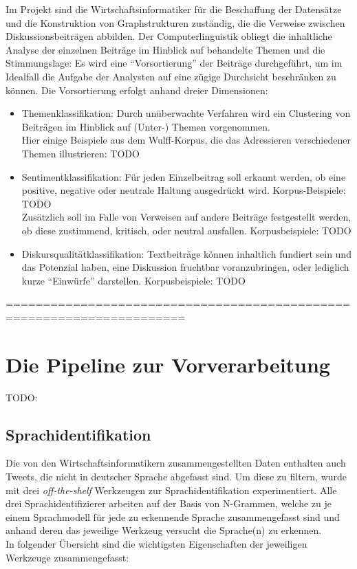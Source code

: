\documentclass[11pt]{article}
\begin{document}
Im Projekt sind die Wirtschaftsinformatiker für die Beschaffung der
Datensätze und die Konstruktion von Graphstrukturen zuständig, die die
Verweise zwischen Diskussionsbeiträgen abbilden. Der
Computerlinguistik obliegt die inhaltliche Analyse der einzelnen
Beiträge im Hinblick auf behandelte Themen und die Stimmungslage: Es
wird eine ``Vorsortierung'' der Beiträge durchgeführt, um im Idealfall
die Aufgabe der Analysten auf eine zügige Durchsicht beschränken zu
können. Die Vorsortierung erfolgt anhand dreier Dimensionen:
\begin{itemize}
\item Themenklassifikation: Durch unüberwachte Verfahren wird ein
  Clustering von Beiträgen im Hinblick auf (Unter-) Themen
  vorgenommen.\\ Hier einige Beispiele aus dem Wulff-Korpus, die das
  Adressieren verschiedener Themen illustrieren: TODO
\item Sentimentklassifikation: Für jeden Einzelbeitrag soll erkannt
  werden, ob eine positive, negative oder neutrale Haltung ausgedrückt
  wird. Korpus-Beispiele: TODO\\ Zusätzlich soll im Falle von Verweisen auf andere Beiträge
  festgestellt werden, ob diese zustimmend, kritisch, oder neutral
  ausfallen. Korpusbeispiele: TODO
\item Diskursqualitätklassifikation: Textbeiträge können inhaltlich
  fundiert sein und das Potenzial haben, eine Diskussion fruchtbar
  voranzubringen, oder lediglich kurze ``Einwürfe''
  darstellen. Korpusbeispiele: TODO
\end{itemize}


======================================================================
\section{Die Pipeline zur Vorverarbeitung}

TODO:
\subsection{Sprachidentifikation}

Die von den Wirtschaftsinformatikern zusammengestellten Daten
enthalten auch Tweets, die nicht in deutscher Sprache abgefasst
sind. Um diese zu filtern, wurde mit drei {\em off-the-shelf} Werkzeugen zur Sprachidentifikation
experimentiert. Alle drei Sprachidentifizierer arbeiten auf der Basis von N-Grammen, welche zu je
einem Sprachmodell für jede zu erkennende Sprache zusammengefasst sind und anhand deren das jeweilige Werkzeug versucht die Sprache(n) zu erkennen. \\ 
In folgender Übersicht sind die wichtigsten Eigenschaften der jeweiligen Werkzeuge zusammengefasst:  \\
\end{document}

